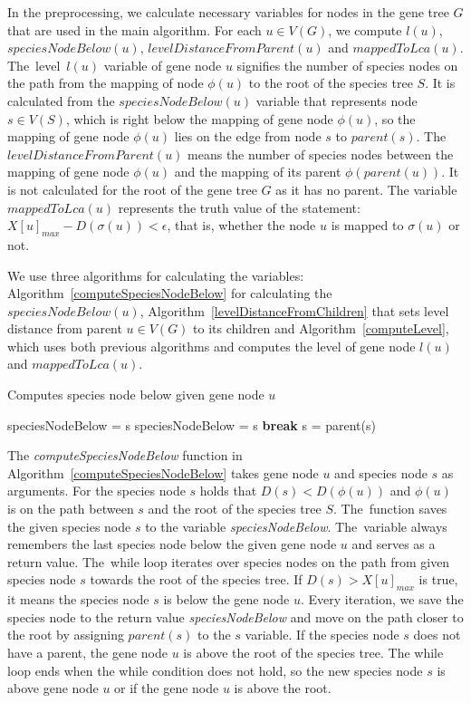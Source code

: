 In the preprocessing, we calculate necessary variables for nodes in the gene tree $G$ that are used in the main algorithm. For each $u \in V(G)$, we compute $l(u)$, $speciesNodeBelow(u)$, $levelDistanceFromParent(u)$ and $mappedToLca(u)$. The~level~$l(u)$ variable of gene node $u$ signifies the number of species nodes on the path from the mapping of node $\phi(u)$ to the root of the species tree $S$. It is calculated from the $speciesNodeBelow(u)$ variable that represents node $s \in V(S)$, which is right below the mapping of gene node $\phi(u)$, so the mapping of gene node $\phi(u)$ lies on the edge from node $s$ to $parent(s)$. The $levelDistanceFromParent(u)$ means the number of species nodes between the mapping of gene node $\phi(u)$ and the mapping of its parent $\phi(parent(u))$. It is not calculated for the root of the gene tree $G$ as it has no parent. The variable $mappedToLca(u)$ represents the truth value of the statement: $X[u]_{max} - D(\sigma(u)) < \epsilon$, that is, whether the node $u$ is mapped to $\sigma(u)$ or not. 

We use three algorithms for calculating the variables: Algorithm~\ref{computeSpeciesNodeBelow} for calculating the $speciesNodeBelow(u)$, Algorithm~\ref{levelDistanceFromChildren} that sets level distance from parent $u \in V(G)$ to its children and Algorithm~\ref{computeLevel}, which uses both previous algorithms and computes the level of gene node $l(u)$ and $mappedToLca(u)$.

\begin{algorithm}[!htbp]
\caption{Computes species node below given gene node $u$} 
\label{computeSpeciesNodeBelow}
\begin{algorithmic}[1]
	\State speciesNodeBelow = s
		\State speciesNodeBelow = s
			\State \textbf{break}
		\Else
			\State s = parent(s)
		\EndIf
	\EndWhile
\EndFunction
\end{algorithmic}
\end{algorithm}

The \emph{computeSpeciesNodeBelow} function in Algorithm~\ref{computeSpeciesNodeBelow} takes gene node $u$ and species node $s$ as arguments. For the species node $s$ holds that $D(s) < D(\phi(u))$ and $\phi(u)$ is on the path between $s$ and the root of the species tree $S$. The~function saves the given species node $s$ to the variable \emph{speciesNodeBelow}. The~variable always remembers the last species node below the given gene node $u$ and serves as a return value. The~while loop iterates over species nodes on the path from given species node $s$ towards the root of the species tree. If $D(s) > X[u]_{max}$ is true, it means the species node $s$ is below the gene node $u$. Every iteration, we save the species node to the return value \emph{speciesNodeBelow} and move on the path closer to the root by assigning $parent(s)$ to the $s$ variable. If the species node $s$ does not have a parent, the gene node $u$ is above the root of the species tree. The while loop ends when the while condition does not hold, so the new species node $s$ is above gene node $u$ or if the gene node $u$ is above the root.

